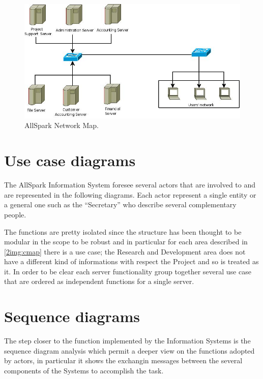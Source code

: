 \begin{figure}
\begin{centering}
\includegraphics[scale=0.45]{assign3/dia/NetMap.jpeg}
\caption{AllSpark Network Map.}
\label{3img:NetMap}
\end{centering}
\end{figure}


\section{Use case diagrams}
The AllSpark Information System foresee several actors that are involved to and are represented in the following diagrams. Each actor represent a single entity or a general one such as the ``Secretary'' who describe several complementary people.

The functions are pretty isolated since the structure has been thought to be modular in the scope to be robust and in particular for each area described in \ref{2img:cmap} there is a use case; the Research and Development area does not have a different kind of informations with respect the Project and so is treated as it. In order to be clear each server functionality group together several use case that are ordered as independent functions for a single server.
 





\section{Sequence diagrams}
The step closer to the function implemented by the Information Systems is the sequence diagram analysis which permit a deeper view on the functions adopted by actors, in particular it shows the exchangin messages between the several components of the Systems to accomplish the task.

